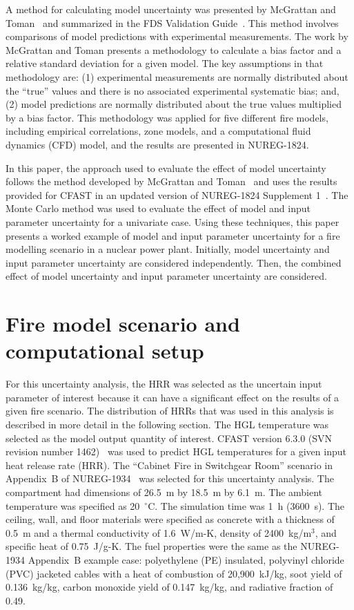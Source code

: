 \documentclass[12pt]{article}
\begin{document}
A method for calculating model uncertainty was presented by McGrattan and Toman~\cite{McGrattan2011a} and summarized in the FDS Validation Guide~\cite{FDS_Validation_Guide}. This method involves comparisons of model predictions with experimental measurements. The work by McGrattan and Toman presents a methodology to calculate a bias factor and a relative standard deviation for a given model. The key assumptions in that methodology are: (1) experimental measurements are normally distributed about the ``true'' values and there is no associated experimental systematic bias; and, (2) model predictions are normally distributed about the true values multiplied by a bias factor. This methodology was applied for five different fire models, including empirical correlations, zone models, and a computational fluid dynamics (CFD) model, and the results are presented in NUREG-1824.

In this paper, the approach used to evaluate the effect of model uncertainty follows the method developed by McGrattan and Toman~\cite{McGrattan2011a} and uses the results provided for CFAST in an updated version of NUREG-1824 Supplement 1~\cite{NUREG_1824_Sup_1}. The Monte Carlo method was used to evaluate the effect of model and input parameter uncertainty for a univariate case. Using these techniques, this paper presents a worked example of model and input parameter uncertainty for a fire modelling scenario in a nuclear power plant. Initially, model uncertainty and input parameter uncertainty are considered independently. Then, the combined effect of model uncertainty and input parameter uncertainty are considered.

\section{Fire model scenario and computational setup}
\label{sec:fire_model_scenario_setup}

For this uncertainty analysis, the HRR was selected as the uncertain input parameter of interest because it can have a significant effect on the results of a given fire scenario. The distribution of HRRs that was used in this analysis is described in more detail in the following section. The HGL temperature was selected as the model output quantity of interest. CFAST version 6.3.0 (SVN revision number 1462)~\cite{CFAST_Users_Guide_6} was used to predict HGL temperatures for a given input heat release rate (HRR). The ``Cabinet Fire in Switchgear Room'' scenario in Appendix~B of NUREG-1934~\cite{NUREG_1934} was selected for this uncertainty analysis. The compartment had dimensions of 26.5~m by 18.5~m by 6.1~m. The ambient temperature was specified as 20~$^\circ$C. The simulation time was 1~h (3600~s). The ceiling, wall, and floor materials were specified as concrete with a thickness of 0.5~m and a thermal conductivity of 1.6~W/m-K, density of 2400~kg/m$^3$, and specific heat of 0.75~J/g-K. The fuel properties were the same as the NUREG-1934 Appendix~B example case: polyethylene (PE) insulated, polyvinyl chloride (PVC) jacketed cables with a heat of combustion of 20,900~kJ/kg, soot yield of 0.136~kg/kg, carbon monoxide yield of 0.147~kg/kg, and radiative fraction of 0.49.
\end{document}
